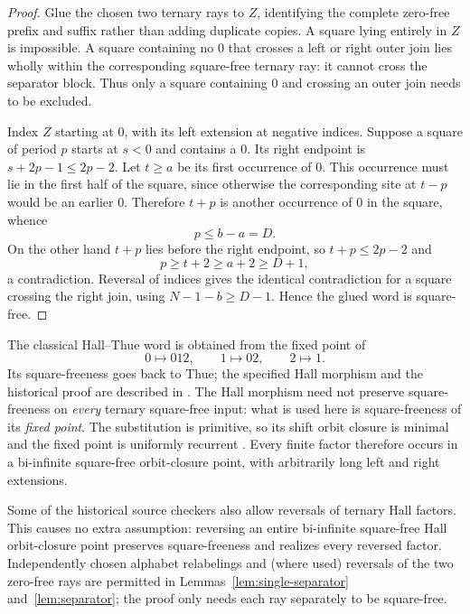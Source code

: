 \documentclass[11pt]{article}
\theoremstyle{remark}
\begin{document}
\begin{proof}
Glue the chosen two ternary rays to $Z$, identifying the complete
zero-free prefix and suffix rather than adding duplicate copies.
A square lying entirely in $Z$ is impossible. A square containing no
$0$ that crosses a left or right outer join lies wholly within the
corresponding square-free ternary ray: it cannot cross the separator
block. Thus only a square containing $0$ and crossing an outer join
needs to be excluded.

Index $Z$ starting at $0$, with its left extension at negative
indices. Suppose a square of period $p$ starts at $s<0$ and contains
a $0$. Its right endpoint is $s+2p-1\le2p-2$. Let $t\ge a$ be its
first occurrence of $0$. This occurrence must lie in the first
half of the square, since otherwise the corresponding site at $t-p$
would be an earlier $0$. Therefore $t+p$ is another occurrence
of $0$ in the square, whence
\[
   p\le b-a=D.
\]
On the other hand $t+p$ lies before the right endpoint, so
$t+p\le 2p-2$ and
\[
   p\ge t+2\ge a+2\ge D+1,
\]
a contradiction. Reversal of indices gives the identical
contradiction for a square crossing the right join, using
$N-1-b\ge D-1$. Hence the glued word is square-free.
\end{proof}

The classical Hall--Thue word is obtained from the fixed point of
\[
  0\mapsto012,\qquad1\mapsto02,\qquad2\mapsto1.
\]
Its square-freeness goes back to Thue; the
specified Hall morphism and the historical proof are
described in \cite{badkobeh2022avoiding,lothaire2002words}.
The Hall morphism need not preserve square-freeness
on \emph{every} ternary square-free input: what is
used here is square-freeness of its \emph{fixed point}.
The substitution is primitive, so its shift orbit
closure is minimal and the fixed point is uniformly
recurrent \cite[Sec.~5.2]{queffelec2010substitution}.
Every finite factor therefore occurs in a
bi-infinite square-free orbit-closure point, with
arbitrarily long left and right extensions.

Some of the historical source checkers also allow
reversals of ternary Hall factors. This causes
no extra assumption: reversing an entire
bi-infinite square-free Hall orbit-closure point
preserves square-freeness and realizes every reversed
factor. Independently chosen alphabet relabelings
and (where used) reversals of the two zero-free
rays are permitted in
Lemmas~\ref{lem:single-separator}
and~\ref{lem:separator}; the proof only needs
each ray separately to be square-free.
\end{document}
